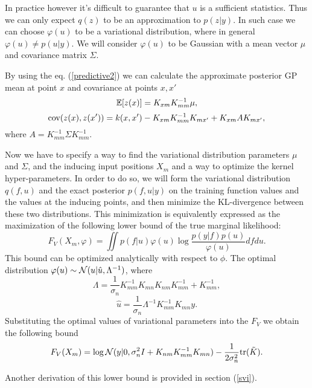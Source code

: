 \documentclass[12pt]{article}
\begin{document}
		In practice however it's difficult to guarantee that $u$ is a sufficient statistics. Thus we can only expect $q(z)$ to be an approximation to $p(z|y)$. In such case we can choose $\varphi(u)$ to be a variational distribution, where in general $\varphi(u) \ne p(u | y)$. We will consider $\varphi(u)$ to be Gaussian with a mean vector $\mu$ and covariance matrix $\Sigma$.

		By using the eq. (\ref{predictive2}) we can calculate the approximate posterior GP mean at point $x$ and covariance at points $x, x'$
		$$\mathbb{E}[z(x)] = K_{xm} K_{mm}^{-1} \mu,$$ 
		$$\mbox{cov}(z(x), z(x')) = k(x, x') - K_{xm} K_{mm}^{-1} K_{mx'} + K_{xm} A K_{mx'},$$
		where $A = K_{mm}^{-1} \Sigma K_{mm}^{-1}$.

		Now we have to specify a way to find the variational distribution parameters $\mu$ and $\Sigma$, and the inducing input positions $X_m$ and a way to optimize the kernel hyper-parameters. 
		In order to do so, we will form the variational distribution $q(f, u)$ and the exact posterior $p(f, u|y)$ on the training function values and the values at the inducing points, and then minimize the KL-divergence between these two distributions. This minimization is equivalently expressed as the maximization of the following lower bound of the true marginal likelihood:
		$$F_V(X_m, \varphi) = \iint p(f|u) \varphi(u) \log \frac{p(y|f) p(u)}{\varphi(u)} df du.$$
		This bound can be optimized analytically with respect to $\phi$. The optimal distribution $\varphi(u) \sim \mathcal{N}(u|\hat u, \Lambda^{-1})$, where
		$$\Lambda = \frac 1 {\sigma_n} K_{mm}^{-1} K_{mn} K_{nm} K_{mm}^{-1} + K_{mm}^{-1},$$
		$$\hat u = \frac 1 {\sigma_n} \Lambda^{-1} K_{mm}^{-1} K_{mn} y.$$
		Substituting the optimal values of variational parameters into the $F_V$ we obtain the following bound
		$$F_V(X_m) = \log \mathcal{N}(y|0, \sigma_n^2 I + K_{nm} K_{mm}^{-1} K_{mn}) - \frac 1 {2\sigma_n^2} \mbox{tr}(\tilde K).$$

		Another derivation of this lower bound is provided in section (\ref{svi}).
\end{document}
